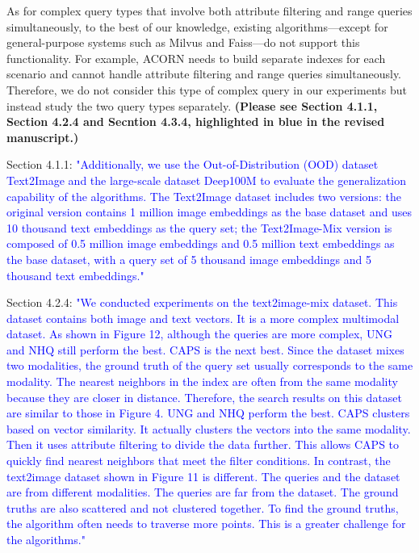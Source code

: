 \documentclass[sigconf, nonacm]{acmart}
\begin{document}
As for complex query types that involve both attribute filtering and range queries simultaneously, to the best of our knowledge, existing algorithms—except for general-purpose systems such as Milvus and Faiss—do not support this functionality. For example, ACORN needs to build separate indexes for each scenario and cannot handle attribute filtering and range queries simultaneously. Therefore, we do not consider this type of complex query in our experiments but instead study the two query types separately. \textbf{(Please see Section 4.1.1, Section 4.2.4 and Secntion 4.3.4, highlighted in blue in the revised manuscript.)  
}

Section 4.1.1:\textcolor{blue}{
"Additionally, we use the Out-of-Distribution (OOD) dataset Text2Image and the large-scale dataset Deep100M to evaluate the generalization capability of the algorithms. The Text2Image dataset includes two versions: the original version contains 1 million image embeddings as the base dataset and uses 10 thousand text embeddings as the query set; the Text2Image-Mix version is composed of 0.5 million image embeddings and 0.5 million text embeddings as the base dataset, with a query set of 5 thousand image embeddings and 5 thousand text embeddings."
}

Section 4.2.4: \textcolor{blue}{
	"We conducted experiments on the text2image-mix dataset. This dataset contains both image and text vectors. It is a more complex multimodal dataset. As shown in Figure 12, although the queries are more complex, UNG and NHQ still perform the best. CAPS is the next best.
	Since the dataset mixes two modalities, the ground truth of the query set usually corresponds to the same modality. The nearest neighbors in the index are often from the same modality because they are closer in distance. Therefore, the search results on this dataset are similar to those in Figure 4. UNG and NHQ perform the best. CAPS clusters based on vector similarity. It actually clusters the vectors into the same modality. Then it uses attribute filtering to divide the data further. This allows CAPS to quickly find nearest neighbors that meet the filter conditions.
	In contrast, the text2image dataset shown in Figure 11 is different. The queries and the dataset are from different modalities. The queries are far from the dataset. The ground truths are also scattered and not clustered together. To find the ground truths, the algorithm often needs to traverse more points. This is a greater challenge for the algorithms." 
}
\end{document}
